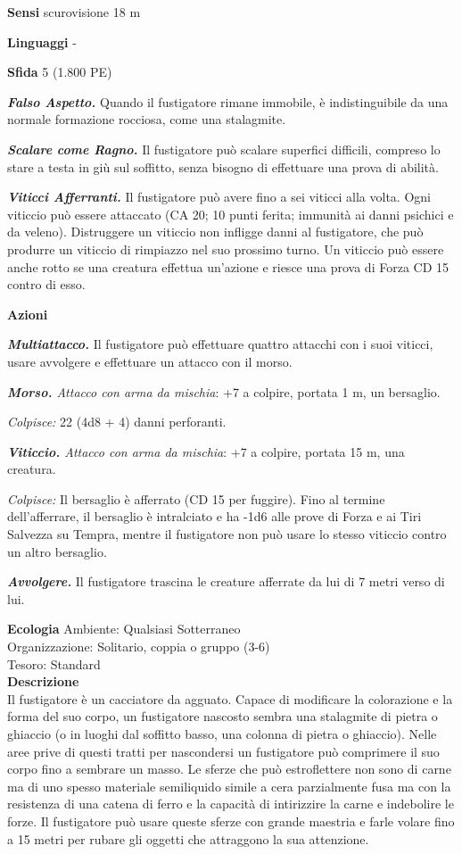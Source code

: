 \begin{multicols}{2}
\textbf{Sensi} scurovisione 18 m

\textbf{Linguaggi} -

\textbf{Sfida} 5 (1.800 PE)

\emph{\textbf{Falso Aspetto.}} Quando il fustigatore rimane immobile, è indistinguibile da una normale formazione rocciosa, come una stalagmite.

\emph{\textbf{Scalare come Ragno.}} Il fustigatore può scalare superfici difficili, compreso lo stare a testa in giù sul soffitto, senza bisogno di effettuare una prova di abilità.

\emph{\textbf{Viticci Afferranti.}} Il fustigatore può avere fino a sei viticci alla volta. Ogni viticcio può essere attaccato (CA 20; 10 punti ferita; immunità ai danni psichici e da veleno). Distruggere un viticcio non infligge danni al fustigatore, che può produrre un viticcio di rimpiazzo nel suo prossimo turno. Un viticcio può essere anche rotto se una creatura effettua un'azione e riesce una prova di Forza CD 15 contro di esso.

\textbf{Azioni}

\emph{\textbf{Multiattacco.}} Il fustigatore può effettuare quattro attacchi con i suoi viticci, usare avvolgere e effettuare un attacco con il morso.

\emph{\textbf{Morso.} Attacco con arma da mischia}: +7 a colpire, portata 1 m, un bersaglio.

\emph{Colpisce:} 22 (4d8 + 4) danni perforanti.

\emph{\textbf{Viticcio.} Attacco con arma da mischia}: +7 a colpire, portata 15 m, una creatura.

\emph{Colpisce:} Il bersaglio è afferrato (CD 15 per fuggire). Fino al termine dell'afferrare, il bersaglio è intralciato e ha -1d6 alle prove di Forza e ai Tiri Salvezza su Tempra, mentre il fustigatore non può usare lo stesso viticcio contro un altro bersaglio.

\emph{\textbf{Avvolgere.}} Il fustigatore trascina le creature afferrate da lui di 7 metri verso di lui.

\textbf{Ecologia}
Ambiente: Qualsiasi Sotterraneo\\
Organizzazione: Solitario, coppia o gruppo (3-6)\\
Tesoro: Standard\\
\textbf{Descrizione}\\
Il fustigatore è un cacciatore da agguato. Capace di modificare la colorazione e la forma del suo corpo, un fustigatore nascosto sembra una stalagmite di pietra o ghiaccio (o in luoghi dal soffitto basso, una colonna di pietra o ghiaccio). Nelle aree prive di questi tratti per nascondersi un fustigatore può comprimere il suo corpo fino a sembrare un masso. Le sferze che può estroflettere non sono di carne ma di uno spesso materiale semiliquido simile a cera parzialmente fusa ma con la resistenza di una catena di ferro e la capacità di intirizzire la carne e indebolire le forze. Il fustigatore può usare queste sferze con grande maestria e farle volare fino a 15 metri per rubare gli oggetti che attraggono la sua attenzione.\\


\end{multicols}
